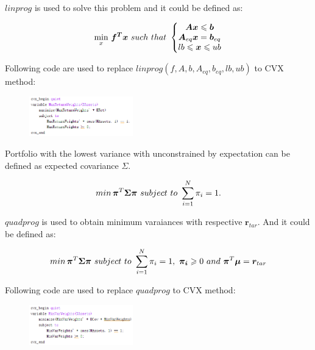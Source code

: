 \documentclass[sigconf]{acmart}
\begin{document}
 $linprog$ is used to solve this problem and it could be defined as: 

\begin{equation} \label{eq2}
\setlength{\abovedisplayskip}{3pt}
\setlength{\belowdisplayskip}{3pt}
\min \limits_{x}\,\bm{f^{T}}\bm{x}\ such\ that\ \left\{\begin{matrix}
\bm{Ax}\leqslant \bm{b}
\\ \bm{A}_{eq}\bm{x}=\bm{b}_{eq}
\\ lb\leqslant \bm{x}\leqslant ub
\end{matrix}\right.
\end{equation}

Following code are used to replace $linprog(f,A,b,A_{eq},b_{eq},lb,ub)$ to CVX method:

\begin{figure}[htbp]
    \centering
    \includegraphics[width=0.4\textwidth]{3.png}
\end{figure}

Portfolio with the lowest variance with unconstrained by expectation can be defined as expected covariance $\Sigma$.

\begin{equation} \label{eq3}
\setlength{\abovedisplayskip}{3pt}
\setlength{\belowdisplayskip}{3pt}
min\,\bm{\pi}^{T}\bm{\Sigma}\bm{\pi}\ subject\ to\ \sum_{i=1}^{N}\pi_{i}=1.
\end{equation}

$quadprog$ is used to obtain minimum varaiances with respective $\bm{r}_{tar}$. And it could be defined as:

\begin{equation} \label{eq4}
\setlength{\abovedisplayskip}{3pt}
\setlength{\belowdisplayskip}{3pt}
min\,\bm{\pi}^{T}\bm{\Sigma}\bm{\pi}\ subject\ to\ \sum_{i=1}^{N}\pi_{i}=1 ,\ \bm{\pi_{i}} \geqslant 0 \ and\ \bm{\pi}^{T}\bm{\mu}=\bm{r}_{tar}
\end{equation}

Following code are used to replace $quadprog$ to CVX method:

\begin{figure}[htbp]
    \centering
    \includegraphics[width=0.4\textwidth]{4.png}
\end{figure}
\end{document}
